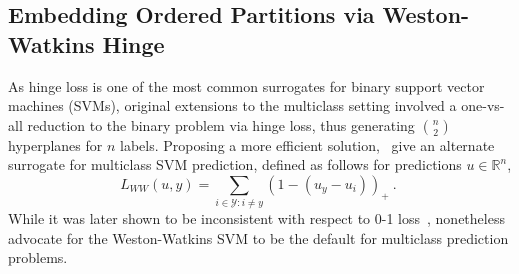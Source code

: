 \documentclass[11pt]{article}
\newcommand{\Comments}{1}
\newcommand{\mynote}[2]{\ifnum\Comments=1\textcolor{#1}{#2}\fi}
\newcommand{\raf}[1]{\mynote{darkgreen}{[RF: #1]}}
\newcommand{\reals}{\mathbb{R}}
\newcommand{\E}{\mathbb{E}}
\newcommand{\Y}{\mathcal{Y}}
\newcommand{\risk}[1]{\underline{#1}}
\newcommand{\inprod}[2]{\langle #1, #2 \rangle}%
\begin{document}

\subsection{Embedding Ordered Partitions via Weston-Watkins Hinge}
\label{sec:winge}
As hinge loss is one of the most common surrogates for binary support vector machines (SVMs), original extensions to the multiclass setting involved a one-vs-all reduction to the binary problem via hinge loss, thus generating ${n \choose 2}$ hyperplanes for $n$ labels.
Proposing a more efficient solution,~\citet{weston1999support} give an alternate surrogate for multiclass SVM prediction, defined as follows for predictions $u \in \reals^n$,
\begin{equation}\label{eq:ww-hinge}
L_{WW}(u,y) = \sum_{i \in \Y : i \neq y} (1 - (u_y - u_i))_+~.~
\end{equation}
While it was later shown to be inconsistent with respect to 0-1 loss~\citep{tewari2007consistency,liu2007fisher}, \citet{dogan2016unified} nonetheless advocate for the Weston-Watkins SVM to be the default for multiclass prediction problems.
\end{document}
